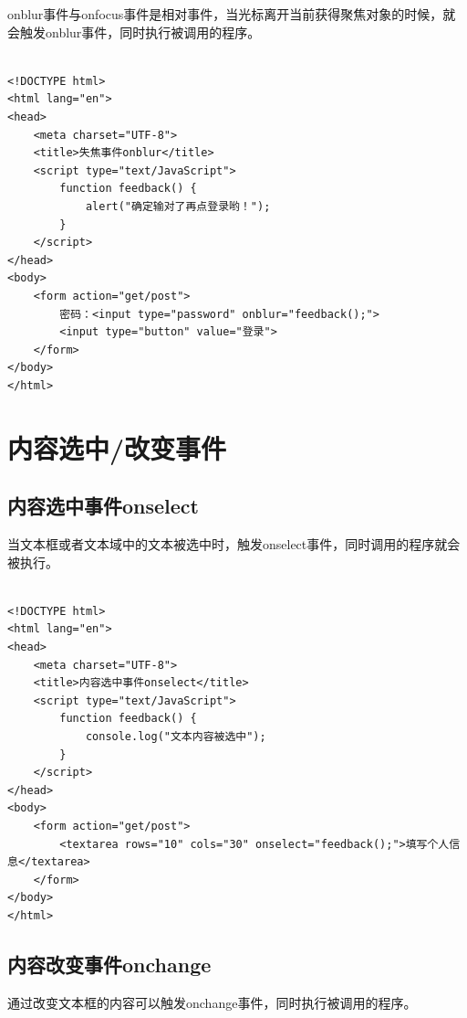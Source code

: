 onblur事件与onfocus事件是相对事件，当光标离开当前获得聚焦对象的时候，就会触发onblur事件，同时执行被调用的程序。 \\

 \\

\begin{lstlisting}[style=htmlcssjs]
<!DOCTYPE html>
<html lang="en">
<head>
    <meta charset="UTF-8">
    <title>失焦事件onblur</title>
    <script type="text/JavaScript">
        function feedback() {
            alert("确定输对了再点登录哟！");
        }
    </script>
</head>
<body>
    <form action="get/post">
        密码：<input type="password" onblur="feedback();">
        <input type="button" value="登录">
    </form>
</body>
</html>
\end{lstlisting}

\newpage

\section{内容选中/改变事件}

\subsection{内容选中事件onselect}

当文本框或者文本域中的文本被选中时，触发onselect事件，同时调用的程序就会被执行。 \\

 \\

\begin{lstlisting}[style=htmlcssjs]
<!DOCTYPE html>
<html lang="en">
<head>
    <meta charset="UTF-8">
    <title>内容选中事件onselect</title>
    <script type="text/JavaScript">
        function feedback() {
            console.log("文本内容被选中");
        }
    </script>
</head>
<body>
    <form action="get/post">
        <textarea rows="10" cols="30" onselect="feedback();">填写个人信息</textarea>
    </form>
</body>
</html>
\end{lstlisting}

\subsection{内容改变事件onchange}

通过改变文本框的内容可以触发onchange事件，同时执行被调用的程序。 \\


